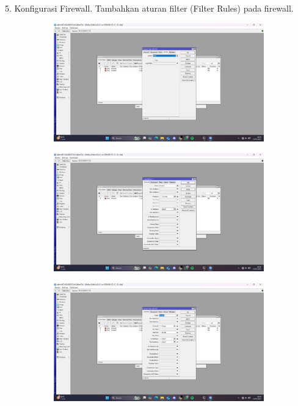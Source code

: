 5. Konfigurasi Firewall. Tambahkan aturan filter (Filter Rules) pada firewall.
\begin{figure}[H]
    \centering
    \begin{subfigure}[b]{0.3\linewidth}
      \centering
      \includegraphics[width=\linewidth]{image/clnt4.jpg}
    \end{subfigure}
    \hspace{1cm}
    \begin{subfigure}[b]{0.3\linewidth}
      \centering
      \includegraphics[width=\linewidth]{image/clnt5.jpg}
    \end{subfigure}
    \begin{subfigure}[b]{0.3\linewidth}
      \centering
      \includegraphics[width=\linewidth]{image/clnt6.jpg}

\end{subfigure}
\end{figure}
